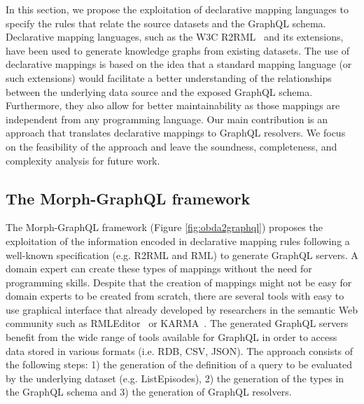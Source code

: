 In this section, we propose the exploitation of declarative mapping languages to specify the rules that relate the source datasets and the GraphQL schema. Declarative mapping languages, such as the W3C R2RML~\citep{R2RML} and its extensions, have been used to generate knowledge graphs from existing datasets. The use of declarative mappings is based on the idea that a standard mapping language (or such extensions) would facilitate a better understanding of the relationships between the underlying data source and the exposed GraphQL schema. Furthermore, they also allow for better maintainability as those mappings are independent from any programming language. Our main contribution is an approach that translates declarative mappings to GraphQL resolvers. We focus on the feasibility of the approach and leave the soundness, completeness, and complexity analysis for future work.

\subsection{The Morph-GraphQL framework}
The Morph-GraphQL framework (Figure \ref{fig:obda2graphql}) proposes the exploitation of the information encoded in declarative mapping rules following a well-known specification (e.g. R2RML and RML) to generate GraphQL servers. A domain expert can create these types of mappings without the need for programming skills. Despite that the creation of mappings might not be easy for domain experts to be created from scratch, there are several tools with easy to use graphical interface that already developed by researchers in the semantic Web community such as RMLEditor~\citep{heyvaert2016rmleditor} or KARMA~\citep{knoblock2015exploiting}. The generated GraphQL servers benefit from the wide range of tools available for GraphQL in order to access data stored in various formats (i.e. RDB, CSV, JSON). The approach consists of the following steps: 1) the generation of the definition of a query to be evaluated by the underlying dataset (e.g. ListEpisodes), 2) the generation of the types in the GraphQL schema and 3) the generation of GraphQL resolvers. 

